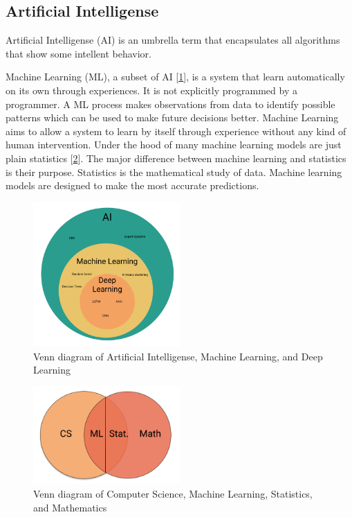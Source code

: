 \subsection{Artificial Intelligense}
Artificial Intelligense (AI) is an umbrella term that encapsulates all algorithms that
show some intellent behavior.

Machine Learning (ML), a subset of AI [\cref{fig:venn-diagram-ml-deep-learning}], is a system that learn automatically on its own through experiences.
It is not explicitly programmed by a programmer. A ML process makes observations from data to identify possible
patterns which can be used to make future decisions better. Machine Learning aims to allow a system to learn by itself through
experience without any kind of human intervention. Under the hood of many machine learning models are just plain statistics [\cref{fig:venn-diagram-cs-ml-deep-learning}].
The major difference between machine learning and statistics is their purpose.
Statistics is the mathematical study of data.
Machine learning models are designed to make the most accurate predictions.


\begin{figure}[h!]
  \centering
  \includegraphics[width=0.5\textwidth]{./figs/illustrations/illustration_venn_diagram_ml_deep_learning.png}
  \hfill
  \caption{Venn diagram of Artificial Intelligense, Machine Learning, and Deep Learning}
  \label{fig:venn-diagram-ml-deep-learning}
\end{figure}
\begin{figure}[h!]
  \centering
  \includegraphics[width=0.5\textwidth]{./figs/illustrations/illustration_venn_diagram_cs_ml_stat_math.png}
  \hfill
  \caption{Venn diagram of Computer Science, Machine Learning, Statistics, and Mathematics}
  \label{fig:venn-diagram-cs-ml-deep-learning}
\end{figure}